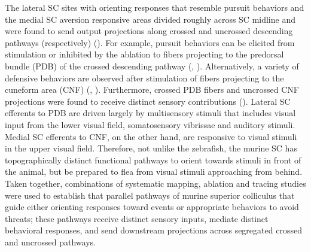 \documentclass{ar-1col}
\begin{document}
{The lateral SC sites with orienting responses that resemble pursuit behaviors and the medial SC aversion responsive areas divided roughly across SC midline and were found to send output projections along crossed and uncrossed descending pathways (respectively) (\cite{dean1989event}). For example, pursuit behaviors can be elicited from stimulation or inhibited by the ablation to fibers projecting to the predorsal bundle (PDB) of the crossed descending pathway (\cite{dean1988organisation}, \cite{dean1986head}). Alternatively, a variety of defensive behaviors are observed after stimulation of fibers projecting to the cuneform area (CNF) (\cite{dean1988responses}, \cite{redgrave1988projection}). Furthermore, crossed PDB fibers and uncrossed CNF projections were found to receive distinct sensory contributions (\cite{westby1990output}). Lateral SC efferents to PDB are driven largely by multisensory stimuli that includes visual input from the lower visual field, somatosensory vibrissae and auditory stimuli. Medial SC efferents to CNF, on the other hand, are responsive to visual stimuli in the upper visual field. Therefore, not unlike the zebrafish, the murine SC has topographically distinct functional pathways to orient towards stimuli in front of the animal, but be prepared to flea from visual stimuli approaching from behind. Taken together, combinations of systematic mapping, ablation and tracing studies were used to establish that parallel pathways of murine superior colliculus that guide either orienting responses toward events or appropriate behaviors to avoid threats; these pathways receive distinct sensory inputs, mediate distinct behavioral responses, and send downstream projections across segregated crossed and uncrossed pathways.

}
\end{document}
